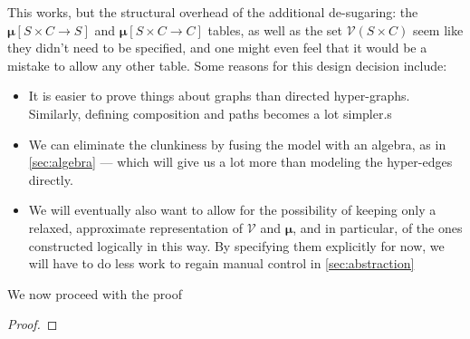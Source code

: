 \documentclass{article}
\newcommand\bmu{\boldsymbol{\mu}}
\begin{document}
\begin{example}[continues=ex:planet]
		This works, but the structural overhead of the additional de-sugaring: the $\boldsymbol\mu[S\times C\to S]$ and $\boldsymbol\mu[S\times C\to C]$ tables, as well as the set $\mathcal V(S \times C)$ seem like they didn't need to be specified, and one might even feel that it would be a mistake to allow any other table. Some reasons for this design decision include:
		\begin{itemize}[nosep]
			\item It is easier to prove things about graphs than directed hyper-graphs. Similarly, defining composition and paths becomes a lot simpler.s
			\item We can eliminate the clunkiness by fusing the model with an algebra, as in \cref{sec:algebra} --- which will give us a lot more than modeling the hyper-edges directly.
			\item We will eventually also want to allow for the possibility of keeping only a relaxed, approximate representation of $\mathcal V$ and $\bmu$, and in particular, of the ones constructed logically in this way. By specifying them explicitly for now, we will have to do less work to regain manual control in \cref{sec:abstraction}
		\end{itemize}
	\end{example}

	We now proceed with the proof
	
	\thmhyperequiv*
	\begin{proof}
		\todo{}
	\end{proof}
	
\end{document}
